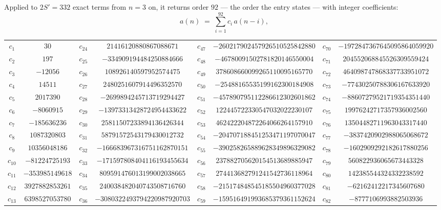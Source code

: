 \documentclass[11pt,a4paper]{article}
\theoremstyle{plain}
\theoremstyle{definition}
\begin{document}
Applied to $2S'=332$ exact terms from $n=3$ on, it returns order $92$ --- the
order the entry states --- with integer coefficients:
\[
a(n)\;=\;\sum_{i=1}^{92}c_i\,a(n-i),
\]
\begin{center}\small
\begin{tabular}{cccccccc}
$c_{1}$ & $30$ & $c_{24}$ & $21416120880867088671$ & $c_{47}$ & $-260217902457926510525842880$ & $c_{70}$ & $-1972847367645095864059920$ \\
$c_{2}$ & $197$ & $c_{25}$ & $-334909194484250884666$ & $c_{48}$ & $-46780091502781820146550004$ & $c_{71}$ & $204552068845526309559424$ \\
$c_{3}$ & $-12056$ & $c_{26}$ & $108926140597952574475$ & $c_{49}$ & $378608660099265110095165770$ & $c_{72}$ & $464098747868337733951072$ \\
$c_{4}$ & $14511$ & $c_{27}$ & $2480251607914496352570$ & $c_{50}$ & $-25488165535199162300184908$ & $c_{73}$ & $-77430250788306167633920$ \\
$c_{5}$ & $2017390$ & $c_{28}$ & $-2699894245713719294427$ & $c_{51}$ & $-457890795112286612302601862$ & $c_{74}$ & $-88607279521719354351440$ \\
$c_{6}$ & $-8060915$ & $c_{29}$ & $-13973313428724954433622$ & $c_{52}$ & $122445722330547032022230107$ & $c_{75}$ & $19976242717357936002560$ \\
$c_{7}$ & $-185636236$ & $c_{30}$ & $25811507233894136426344$ & $c_{53}$ & $462422204872264066264157910$ & $c_{76}$ & $13504482711963043317440$ \\
$c_{8}$ & $1087320803$ & $c_{31}$ & $58791572543179430012732$ & $c_{54}$ & $-204707188451253471197070047$ & $c_{77}$ & $-3837420902988065068672$ \\
$c_{9}$ & $10356048186$ & $c_{32}$ & $-166683967316751162870151$ & $c_{55}$ & $-390258265889628349896329082$ & $c_{78}$ & $-1602909292182617880256$ \\
$c_{10}$ & $-81224725193$ & $c_{33}$ & $-171597808404116193455634$ & $c_{56}$ & $237882705620154513689885947$ & $c_{79}$ & $560822936065673443328$ \\
$c_{11}$ & $-353985149618$ & $c_{34}$ & $809591476013199002038665$ & $c_{57}$ & $274413682791241542736118964$ & $c_{80}$ & $142385544324332238592$ \\
$c_{12}$ & $3927882853261$ & $c_{35}$ & $240038482040743508716760$ & $c_{58}$ & $-215174848545185504960377028$ & $c_{81}$ & $-62162412217345607680$ \\
$c_{13}$ & $6398527053780$ & $c_{36}$ & $-3080322493794220987920703$ & $c_{59}$ & $-159516491993685379361152624$ & $c_{82}$ & $-8777106993882503936$ \\

\end{tabular}
\end{center}
\end{document}
